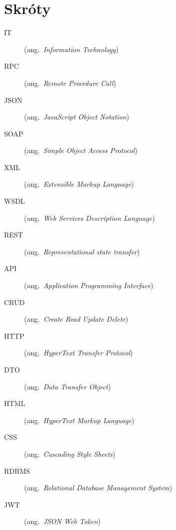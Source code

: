 \chapter*{Skróty}\mbox{}
\label{sec:skroty}
\noindent
\begin{description}
  \item[IT] (ang.\ \emph{Information Technology})
	\item[RPC] (ang.\ \emph{Remote Procedure Call})
	\item[JSON] (ang.\ \emph{JavaScript Object Notation})
	\item[SOAP] (ang.\ \emph{Simple Object Access Protocol})
  \item[XML] (ang.\ \emph{Extensible Markup Language})
  \item[WSDL] (ang.\ \emph{Web Services Description Language})
	\item[REST] (ang.\ \emph{Representational state transfer}) 
	\item[API] (ang.\ \emph{Application Programming Interface}) 
	\item[CRUD] (ang.\ \emph{Create Read Update Delete}) 
	\item[HTTP] (ang.\ \emph{HyperText Transfer Protocol}) 
	\item[DTO] (ang.\ \emph{Data Transfer Object}) 
	\item[HTML] (ang.\ \emph{HyperText Markup Language}) 
	\item[CSS] (ang.\ \emph{Cascading Style Sheets}) 
	\item[RDBMS] (ang.\ \emph{Relational Database Management System}) 
	\item[JWT] (ang.\ \emph{JSON Web Token})
\end{description}
